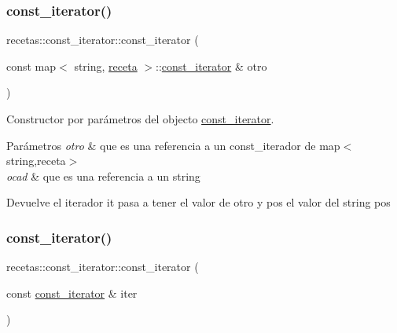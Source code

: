 \subsubsection{\texorpdfstring{const\+\_\+iterator()}{const\_iterator()}\hspace{0.1cm}{\footnotesize\ttfamily [2/3]}}
{\footnotesize\ttfamily recetas\+::const\+\_\+iterator\+::const\+\_\+iterator (\begin{DoxyParamCaption}\item[{const map$<$ string, \hyperlink{classreceta}{receta} $>$\+::\hyperlink{classrecetas_1_1const__iterator}{const\+\_\+iterator} \&}]{otro }\end{DoxyParamCaption})\hspace{0.3cm}{\ttfamily [inline]}}



Constructor por parámetros del objecto \hyperlink{classrecetas_1_1const__iterator}{const\+\_\+iterator}. 


\begin{DoxyParams}{Parámetros}
{\em otro} & que es una referencia a un const\+\_\+iterador de map$<$string,receta$>$ \\
\hline
{\em ocad} & que es una referencia a un string \\
\hline
\end{DoxyParams}
\begin{DoxyReturn}{Devuelve}
el iterador it pasa a tener el valor de otro y pos el valor del string pos 
\end{DoxyReturn}
\mbox{\label{classrecetas_1_1const__iterator_ad9cbdccd55ffd584e362bed2e30bf8b9}} 
\subsubsection{\texorpdfstring{const\+\_\+iterator()}{const\_iterator()}\hspace{0.1cm}{\footnotesize\ttfamily [3/3]}}
{\footnotesize\ttfamily recetas\+::const\+\_\+iterator\+::const\+\_\+iterator (\begin{DoxyParamCaption}\item[{const \hyperlink{classrecetas_1_1const__iterator}{const\+\_\+iterator} \&}]{iter }\end{DoxyParamCaption})\hspace{0.3cm}{\ttfamily [inline]}}




